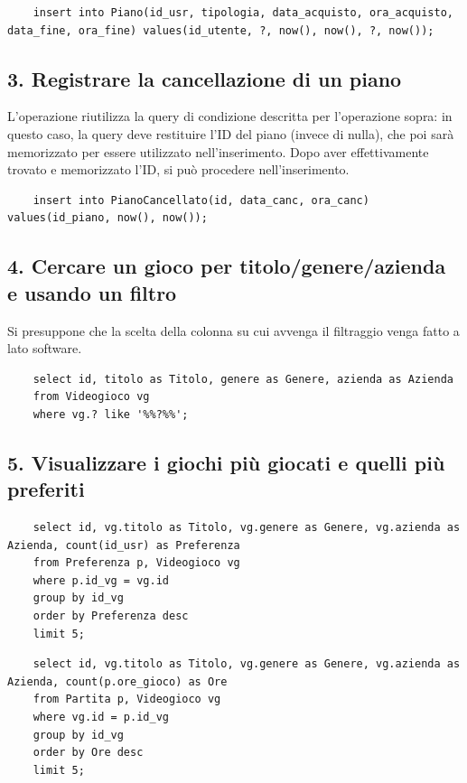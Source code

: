 \documentclass[a4paper,12pt]{report}
\begin{document}
	\begin{lstlisting}
    insert into Piano(id_usr, tipologia, data_acquisto, ora_acquisto, data_fine, ora_fine) values(id_utente, ?, now(), now(), ?, now());
    \end{lstlisting}

\subsection*{3. Registrare la cancellazione di un piano}

L'operazione riutilizza la query di condizione descritta per l'operazione sopra: in questo caso, la query deve restituire l'ID del piano (invece di nulla), che poi sarà memorizzato per essere utilizzato nell'inserimento.
Dopo aver effettivamente trovato e memorizzato l'ID, si può procedere nell'inserimento.

    \begin{lstlisting}
    insert into PianoCancellato(id, data_canc, ora_canc) values(id_piano, now(), now());
    \end{lstlisting}

\subsection*{4. Cercare un gioco per titolo/genere/azienda e usando un filtro}

Si presuppone che la scelta della colonna su cui avvenga il filtraggio venga fatto a lato software.

    \begin{lstlisting}
    select id, titolo as Titolo, genere as Genere, azienda as Azienda
    from Videogioco vg
    where vg.? like '%%?%%';
    \end{lstlisting}

\subsection*{5. Visualizzare i giochi più giocati e quelli più preferiti}

    \begin{lstlisting}
    select id, vg.titolo as Titolo, vg.genere as Genere, vg.azienda as Azienda, count(id_usr) as Preferenza
    from Preferenza p, Videogioco vg
    where p.id_vg = vg.id
    group by id_vg
    order by Preferenza desc
    limit 5;
    \end{lstlisting}

	\begin{lstlisting}
    select id, vg.titolo as Titolo, vg.genere as Genere, vg.azienda as Azienda, count(p.ore_gioco) as Ore
    from Partita p, Videogioco vg
    where vg.id = p.id_vg
    group by id_vg
    order by Ore desc
    limit 5;
    \end{lstlisting}
\end{document}
